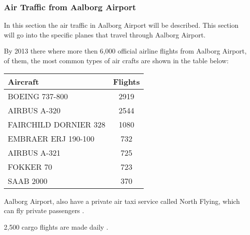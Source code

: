 \subsubsection{Air Traffic from Aalborg Airport}

In this section the air traffic in Aalborg Airport will be described. This section will go into the specific planes that travel through Aalborg Airport.


By 2013 there where more then 6,000 official airline flights from Aalborg Airport, of them, the most common types of air crafts are shown in the table below:

\begin{center}
    \begin{tabular}{ | l | c | }
        \hline
        Aircraft & Flights\\ \hline
        BOEING 737-800 & 2919\\ \hline
        AIRBUS A-320 & 2544\\ \hline
        FAIRCHILD DORNIER 328 & 1080\\ \hline
        EMBRAER ERJ 190-100 & 732\\ \hline
        AIRBUS A-321 & 725\\ \hline
        FOKKER 70 & 723\\ \hline
        SAAB 2000 & 370\\ \hline
    \end{tabular}
\end{center}


Aalborg Airport, also have a private air taxi service called North Flying, which can fly private passengers \cite{north_flying}.

2,500 cargo flights are made daily \cite{cargo_lufthavn}.

